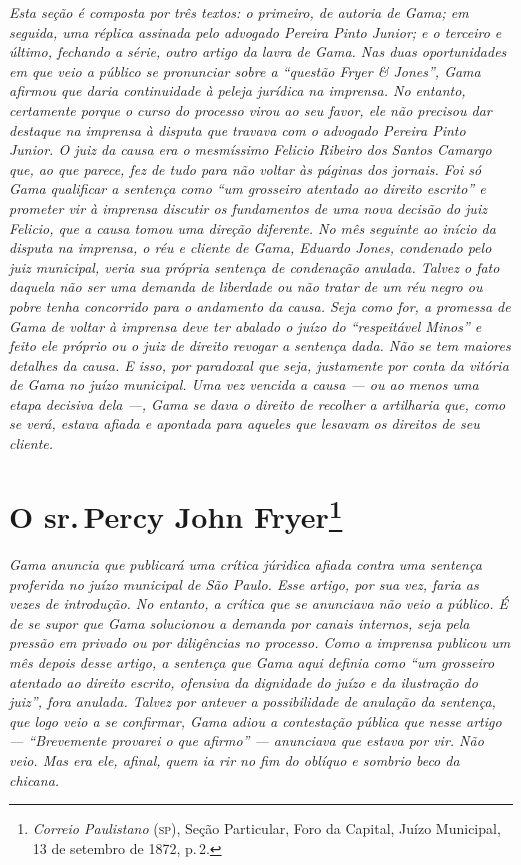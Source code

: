 \begin{argumento}
\emph{Esta seção é composta por três textos: o primeiro, de autoria de
Gama; em seguida, uma réplica assinada pelo advogado Pereira Pinto
Junior; e o terceiro e último, fechando a série, outro artigo da lavra
de Gama. Nas duas oportunidades em que veio a público se pronunciar
sobre a ``questão Fryer \& Jones'', Gama afirmou que daria continuidade à
peleja jurídica na imprensa. No entanto, certamente porque o curso do
processo virou ao seu favor, ele não precisou dar destaque na imprensa à
disputa que travava com o advogado Pereira Pinto Junior. O juiz da causa
era o mesmíssimo Felicio Ribeiro dos Santos Camargo que, ao que parece,
fez de tudo para não voltar às páginas dos jornais. Foi só Gama
qualificar a sentença como ``um grosseiro atentado ao direito escrito'' e
prometer vir à imprensa discutir os fundamentos de uma nova decisão do
juiz Felicio, que a causa tomou uma direção diferente. No mês seguinte
ao início da disputa na imprensa, o réu e cliente de Gama, Eduardo
Jones, condenado pelo juiz municipal, veria sua própria sentença de
condenação anulada. Talvez o fato daquela não ser uma demanda de
liberdade ou não tratar de um réu negro ou pobre tenha concorrido para o
andamento da causa. Seja como for, a promessa de Gama de voltar à
imprensa deve ter abalado o juízo do ``respeitável Minos'' e feito ele
próprio ou o juiz de direito revogar a sentença dada. Não se tem maiores
detalhes da causa. E isso, por paradoxal que seja, justamente por conta
da vitória de Gama no juízo municipal. Uma vez vencida a causa --- ou ao
menos uma etapa decisiva dela ---, Gama se dava o direito de recolher a
artilharia que, como se verá, estava afiada e apontada para aqueles que
lesavam os direitos de seu cliente.}
\end{argumento}

\chapter{O sr.\,Percy John Fryer\footnote{\emph{Correio Paulistano} (\textsc{sp}), Seção Particular, Foro da Capital, Juízo Municipal, 13 de setembro de 1872, p.\,2.}} %

\begin{didascalia}
\emph{Gama anuncia que publicará uma crítica júridica afiada contra uma
sentença proferida no juízo municipal de São Paulo. Esse artigo, por sua
vez, faria as vezes de introdução. No entanto, a crítica que se
anunciava não veio a público. É de se supor que Gama solucionou a
demanda por canais internos, seja pela pressão em privado ou por
diligências no processo. Como a imprensa publicou um mês depois desse
artigo, a sentença que Gama aqui definia como ``um grosseiro atentado ao
direito escrito, ofensiva da dignidade do juízo e da ilustração do
juiz'', fora anulada. Talvez por antever a possibilidade de anulação da
sentença, que logo veio a se confirmar, Gama adiou a contestação pública
que nesse artigo --- ``Brevemente provarei o que afirmo'' --- anunciava que
estava por vir. Não veio. Mas era ele, afinal, quem ia rir no fim do
oblíquo e sombrio beco da chicana.}
\end{didascalia}

